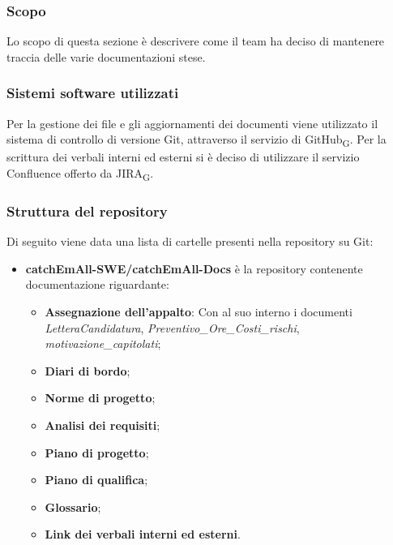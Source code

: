 \subsubsection{Scopo}
Lo scopo di questa sezione è descrivere come il team ha deciso di mantenere traccia delle varie documentazioni stese.

\subsubsection{Sistemi software utilizzati}
Per la gestione dei file e gli aggiornamenti dei documenti viene utilizzato il sistema di controllo di versione Git, attraverso il servizio di GitHub\textsubscript{G}. Per la scrittura dei verbali interni ed esterni si è deciso di utilizzare il servizio Confluence offerto da JIRA\textsubscript{G}.

\subsubsection{Struttura del repository}
Di seguito viene data una lista di cartelle presenti nella repository su Git:
\begin{itemize}
\item \textbf{catchEmAll-SWE/catchEmAll-Docs} è la repository contenente documentazione riguardante:
\begin{itemize}
    \item \textbf{Assegnazione dell'appalto}: Con al suo interno i documenti \textit{LetteraCandidatura}, \textit{Preventivo\_Ore\_Costi\_rischi}, \textit{motivazione\_capitolati};
    \item \textbf{Diari di bordo};
    \item \textbf{Norme di progetto};
    \item \textbf{Analisi dei requisiti};
    \item \textbf{Piano di progetto};
    \item \textbf{Piano di qualifica};
    \item \textbf{Glossario};
    \item \textbf{Link dei verbali interni ed esterni}.
\end{itemize}
\end{itemize}
